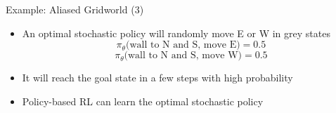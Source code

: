 \begin{frame}[c]{Example: Aliased Gridworld (3)}
	
	\begin{itemize}
		\item An optimal \alert{stochastic} policy will randomly move E or W in grey states
		$$\pi_\theta\text{(wall to N and S, move E)} = 0.5 $$
		$$\pi_\theta\text{(wall to N and S, move W)} = 0.5 $$
		\item It will reach the goal state in a few steps with high probability
		\item Policy-based RL can learn the optimal stochastic policy
	\end{itemize}
	
\end{frame}

